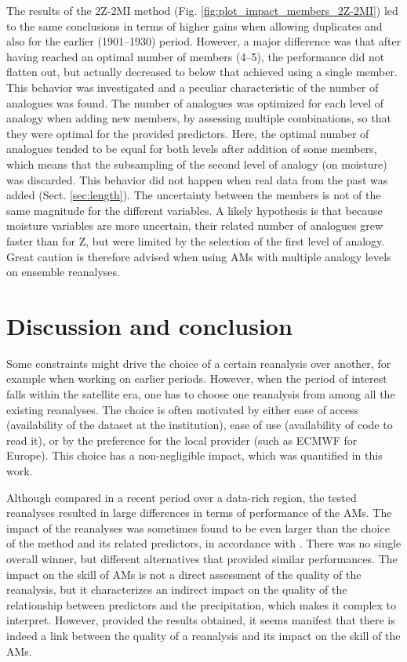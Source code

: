 \documentclass[smallextended]{svjour3}       %
\begin{document}
	The results of the 2Z-2MI method (Fig. \ref{fig:plot_impact_members_2Z-2MI}) led to the same conclusions in terms of higher gains when allowing duplicates and also for the earlier (1901--1930) period. However, a major difference was that after having reached an optimal number of members (4--5), the performance did not flatten out, but actually decreased to below that achieved using a single member. This behavior was investigated and a peculiar characteristic of the number of analogues was found. The number of analogues was optimized for each level of analogy when adding new members, by assessing multiple combinations, so that they were optimal for the provided predictors. Here, the optimal number of analogues tended to be equal for both levels after addition of some members, which means that the subsampling of the second level of analogy (on moisture) was discarded. This behavior did not happen when real data from the past was added (Sect. \ref{sec:length}). The uncertainty between the members is not of the same magnitude for the different variables. A likely hypothesis is that because moisture variables are more uncertain, their related number of analogues grew faster than for Z, but were limited by the selection of the first level of analogy. Great caution is therefore advised when using AMs with multiple analogy levels on ensemble reanalyses.
	
	
	\section{Discussion and conclusion}
	\label{sec:discussion-conclusion}
	
	Some constraints might drive the choice of a certain reanalysis over another, for example when working on earlier periods. However, when the period of interest falls within the satellite era, one has to choose one reanalysis from among all the existing reanalyses. The choice is often motivated by either ease of access (availability of the dataset at the institution), ease of use (availability of code to read it), or by the preference for the local provider (such as ECMWF for Europe). This choice has a non-negligible impact, which was quantified in this work.
	
	Although compared in a recent period over a data-rich region, the tested reanalyses resulted in large differences in terms of performance of the AMs. The impact of the reanalyses was sometimes found to be even larger than the choice of the method and its related predictors, in accordance with \citet{Dayon2015}. There was no single overall winner, but different alternatives that provided similar performances. The impact on the skill of AMs is not a direct assessment of the quality of the reanalysis, but it characterizes an indirect impact on the quality of the relationship between predictors and the precipitation, which makes it complex to interpret. However, provided the results obtained, it seems manifest that there is indeed a link between the quality of a reanalysis and its impact on the skill of the AMs.
	
\end{document}
